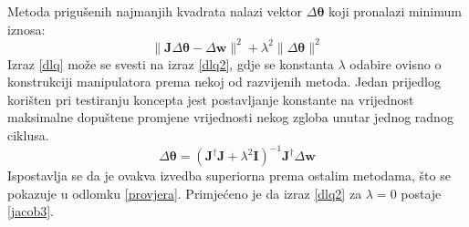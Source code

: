 \documentclass[times, utf8, diplomski, numeric]{fer}
\begin{document}
Metoda prigušenih najmanjih kvadrata nalazi vektor $\Delta \bm{\theta}$ koji pronalazi minimum iznosa:
\begin{equation}
\|\mathbf{J}\Delta \bm{\theta} - \Delta \textbf{w}\|^2 + \lambda^2\|\Delta \bm{\theta}\|^2 \label{dlq}
\end{equation}
Izraz \ref{dlq} može se svesti na izraz \ref{dlq2}, gdje se konstanta $\lambda$ odabire ovisno o konstrukciji manipulatora prema nekoj od razvijenih metoda.
Jedan prijedlog korišten pri testiranju koncepta jest postavljanje konstante na vrijednost maksimalne dopuštene promjene vrijednosti nekog zgloba unutar jednog radnog ciklusa.
\begin{equation}
\Delta \bm{\theta} = \left(\mathbf{J}^{\dagger} \mathbf{J} + \lambda^2\mathbf{I}\right)^{-1}\mathbf{J}^{\dagger} \Delta \mathbf{w} \label{dlq2}
\end{equation}
Ispostavlja se da je ovakva izvedba superiorna prema ostalim metodama, što se pokazuje u odlomku \ref{provjera}.
Primjećeno je da izraz \ref{dlq2} za $\lambda = 0$ postaje \ref{jacob3}.
\end{document}
